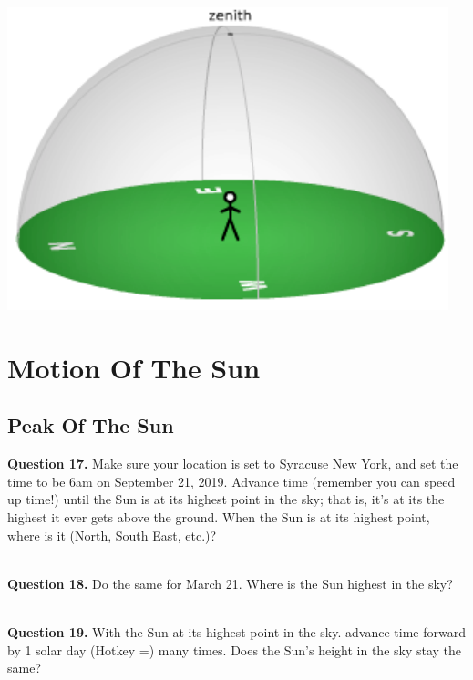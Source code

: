 \documentclass[11pt]{article}
\begin{document}
\begin{center}
	\includegraphics{local_sky}
\end{center}

\newpage

\section{Motion Of The Sun}

\subsection{Peak Of The Sun}

\textbf{Question 17.} Make sure your location is set to Syracuse New York, and set the time to be 6am on September 21, 2019. Advance time (remember you can speed up time!) until the Sun is at its highest point in the sky; that is, it's at its the highest it ever gets above the ground. When the Sun is at its highest point, where is it (North, South East, etc.)?\\
\vspace*{1.5cm}

\hrulefill\\

\textbf{Question 18.} Do the same for March 21. Where is the Sun highest in the sky?\\
\vspace*{1.5cm}

\hrulefill\\

\textbf{Question 19.} With the Sun at its highest point in the sky. advance time forward by 1 solar day (Hotkey =) many times. Does the Sun's height in the sky stay the same?\\
\vspace*{1.5cm}
\end{document}
